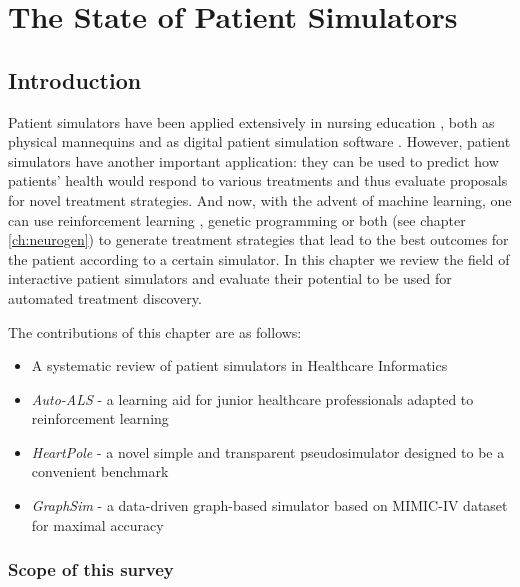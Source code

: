 \chapter{The State of Patient Simulators}
\label{ch:simulators-sota}

\section{Introduction}
\label{sec:intro}

Patient simulators have been applied extensively in nursing education \cite{didactic-sims1,didactic-sims2,didactic-sims3}, both as physical mannequins and as digital patient simulation software \cite{didactic-virtual}.
However, patient simulators have another important application: they can be used to predict how patients' health would respond to various treatments and thus evaluate proposals for novel treatment strategies.
And now, with the advent of machine learning, one can use reinforcement learning \cite{healthcare-rl}, genetic programming or both (see chapter \ref{ch:neurogen}) to generate treatment strategies that lead to the best outcomes for the patient according to a certain simulator.
In this chapter we review the field of interactive patient simulators and evaluate their potential to be used for automated treatment discovery.

The contributions of this chapter are as follows:
\begin{itemize}
    \item A systematic review of patient simulators in Healthcare Informatics 
    \item \emph{Auto-ALS} - a learning aid for junior healthcare professionals adapted to reinforcement learning 
    \item \emph{HeartPole} - a novel simple and transparent pseudosimulator designed to be a convenient benchmark
    \item \emph{GraphSim} - a data-driven graph-based simulator based on MIMIC-IV dataset \cite{mimic} for maximal accuracy
\end{itemize}

\subsection{Scope of this survey}
\label{sec:scope}

